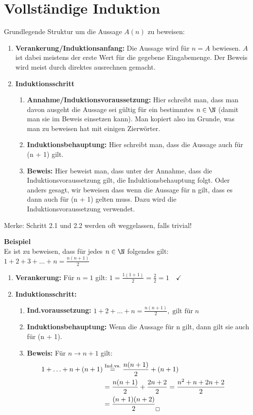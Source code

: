 \section{Vollständige Induktion}
Grundlegende Struktur um die Aussage $A(n)$ zu beweisen:
\begin{enumerate}
	\item \textbf{Verankerung/Induktionsanfang:} Die Aussage wird für $n = A$ bewiesen.
	$A$ ist dabei meistens der erste Wert für die gegebene Eingabemenge.
	Der Beweis wird meist durch direktes ausrechnen gemacht.
	\item \textbf{Induktionsschritt}
	\begin{enumerate}[label*=\arabic*.]
		\item \textbf{Annahme/Induktionsvoraussetzung:} Hier schreibt man,
		dass man davon ausgeht die Aussage sei gültig für ein bestimmtes $n \in \N$ (damit man sie im Beweis
		einsetzen kann). Man kopiert also im Grunde, was man zu beweisen hat mit einigen Zierwörter.
		\item \textbf{Induktionsbehauptung:} Hier schreibt man, dass die Aussage auch für (n + 1) gilt.
		\item \textbf{Beweis:} Hier beweist man, dass unter der Annahme, dass die Induktionsvoraussetzung gilt, die Induktionsbehauptung folgt. Oder anders gesagt, wir beweisen dass wenn die Aussage für n gilt, dass es dann auch für (n + 1) gelten muss. Dazu wird die Induktionsvoraussetzung verwendet.
	\end{enumerate}
\end{enumerate}
Merke: Schritt 2.1 und 2.2 werden oft weggelassen, falls trivial!

\textbf{Beispiel}\\
Es ist zu beweisen, dass für jedes $n \in \N$ folgendes gilt:\\
$1 + 2 + 3 + \ldots + n = \frac{n(n + 1)}{2}$
{\small
	\begin{enumerate}
		\item \textbf{Verankerung:} Für $n = 1$ gilt: $1 = \frac{1 (1 + 1)}{2} = \frac{2}{2} = 1 \quad \checkmark$ 
		\item \textbf{Induktionsschritt:}
		\begin{enumerate}[label*=\arabic*.]
			\item \textbf{Ind.voraussetzung:} $1 + 2 + \ldots + n = \frac{n(n+1)}{2}, \; \text{gilt für} \; n$
			\item \textbf{Induktionsbehauptung:} Wenn die Aussage für n gilt, dann gilt sie auch für (n + 1).
			\item \textbf{Beweis:} Für $n \to n+1$ gilt:
			\begin{align*}
			\hspace{-0.5cm} 1 + \ldots + n + (n+1) &\overset{\text{Ind.vs.}}{=} \frac{n(n+1)}{2} + (n + 1)\\
			&= \frac{n(n+1)}{2} + \frac{2n + 2}{2} = \frac{n^2 + n + 2n + 2}{2} \\
			&= \frac{(n + 1)(n + 2)}{2} _\square
			\end{align*}
		\end{enumerate}
	\end{enumerate}
}